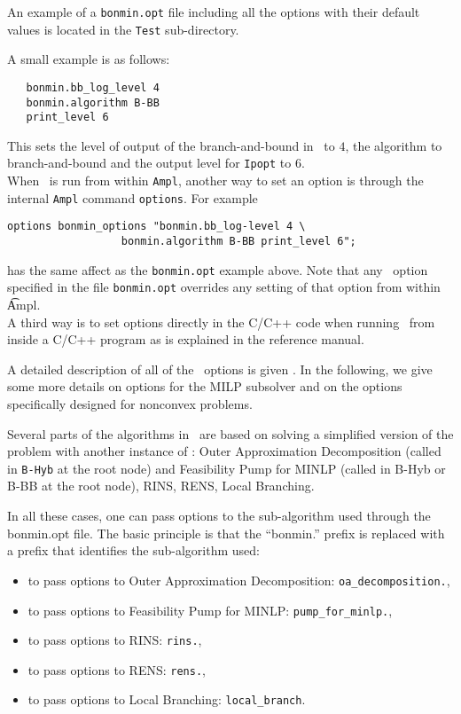 An example of a {\tt bonmin.opt} file including all the options
with their default values is located in the {\tt Test}
sub-directory.

A small example is as follows:
\begin{verbatim}
   bonmin.bb_log_level 4
   bonmin.algorithm B-BB
   print_level 6
\end{verbatim}
This sets the level of output of the branch-and-bound in \Bonmin\ to $4$, the algorithm to branch-and-bound
and the output level for {\tt Ipopt} to $6$.\\

When \Bonmin\ is run from within {\tt Ampl}, another way to set
an option is through the
internal {\tt Ampl} command {\tt options}.
For example
\begin{verbatim}
options bonmin_options "bonmin.bb_log-level 4 \
                  bonmin.algorithm B-BB print_level 6";
\end{verbatim}
has the same affect as the {\tt bonmin.opt} example above.
Note that any \Bonmin\ option specified in the file {\tt bonmin.opt}
overrides any setting of that option from within {\t Ampl}.\\

A third way is to set options directly in the C/C++ code when
running \Bonmin\ from inside a C/C++ program as is explained in the reference manual.

A detailed description of all of the \Bonmin\ options is given .
In the following, we give some more details on options for the MILP subsolver and
on the options specifically designed
for nonconvex problems.\\

\latexhtml{

}{
}

\label{sec:sub_solvers}
Several parts of the algorithms in \Bonmin\ are based on solving a simplified version of the problem with another instance of \Bonmin:
Outer Approximation Decomposition (called in {\tt B-Hyb} at the root node)
and Feasibility Pump for MINLP (called in B-Hyb or B-BB at the root node), RINS, RENS, Local Branching.

In all these cases, one can pass options to the sub-algorithm used through the bonmin.opt file. The basic principle is
that the ``bonmin.'' prefix  is replaced with a prefix that identifies the sub-algorithm used:
\begin{itemize}
\item to pass options to Outer Approximation Decomposition: {\tt oa\_decomposition.},
\item to pass options to Feasibility Pump for MINLP: {\tt pump\_for\_minlp.},
\item to pass options to RINS: {\tt rins.},
\item to pass options to RENS: {\tt rens.},
\item to pass options to Local Branching: {\tt local\_branch}.
\end{itemize}


